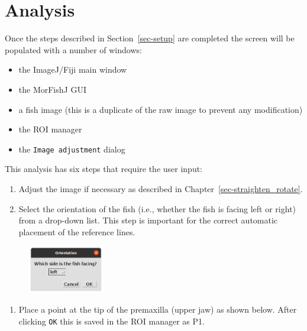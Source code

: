 \documentclass[
  letterpaper,
  DIV=11,
  numbers=noendperiod,
  oneside]{scrreprt}
\providecommand{\tightlist}{%
  \setlength{\itemsep}{0pt}\setlength{\parskip}{0pt}}\usepackage{longtable,booktabs,array}
\begin{document}
\hypertarget{analysis-1}{%
\section{Analysis}\label{analysis-1}}

Once the steps described in Section~\ref{sec-setup} are completed the
screen will be populated with a number of windows:

\begin{itemize}
\tightlist
\item
  the ImageJ/Fiji main window
\item
  the MorFishJ GUI
\item
  a fish image (this is a duplicate of the raw image to prevent any
  modification)
\item
  the ROI manager
\item
  the \texttt{Image\ adjustment} dialog
\end{itemize}

This analysis has six steps that require the user input:

\begin{enumerate}
\def\labelenumi{\arabic{enumi}.}
\item
  Adjust the image if necessary as described in
  Chapter~\ref{sec-straighten_rotate}.
\item
  Select the orientation of the fish (i.e., whether the fish is facing
  left or right) from a drop-down list. This step is important for the
  correct automatic placement of the reference lines.
\end{enumerate}

\begin{figure}

{\centering \includegraphics[width=0.3\textwidth,height=\textheight]{./images/screenshots/orientation.png}

}

\end{figure}

\begin{enumerate}
\def\labelenumi{\arabic{enumi}.}
\setcounter{enumi}{2}
\tightlist
\item
  Place a point at the tip of the premaxilla (upper jaw) as shown below.
  After clicking \texttt{OK} this is saved in the ROI manager as P1.
\end{enumerate}
\end{document}
